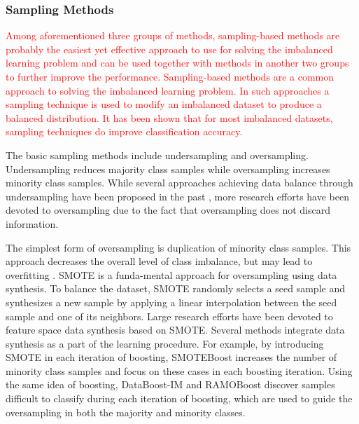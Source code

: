 \documentclass[10pt,journal,compsoc]{IEEEtran}
\begin{document}
\subsubsection{Sampling Methods}
\textcolor{red}{Among aforementioned three groups of methods, sampling-based methods are probably the easiest yet effective approach to use for solving the imbalanced learning problem and can be used together with methods in another two groups to further improve the performance. Sampling-based methods are a common approach to solving the imbalanced learning problem. In such approaches a sampling technique is used to modify an imbalanced dataset to produce a balanced distribution. It has been shown that for most imbalanced datasets, sampling techniques do improve classification accuracy.}

The basic sampling methods include undersampling and oversampling. Undersampling reduces majority class samples while oversampling increases minority class samples. While several approaches achieving data balance through undersampling have been proposed in the past \cite{liu2009exploratory}\cite{ZJMI03}, more research efforts have been devoted to oversampling due to the fact that oversampling does not discard information.

The simplest form of oversampling is duplication of minority class samples. This approach decreases the overall level of class imbalance, but may lead to overfitting \cite{Drummond03c4.5}. SMOTE \cite{CNV:02} is a funda-mental approach for oversampling using data synthesis. To balance the dataset, SMOTE randomly selects a seed sample and synthesizes a new sample by applying a linear interpolation between the seed sample and one of its neighbors. Large research efforts have been devoted to feature space data synthesis based on SMOTE.
Several methods integrate data synthesis as a part of the learning procedure. For example, by introducing SMOTE in each iteration of boosting, SMOTEBoost \cite{chawla2003smoteboost} increases the number of minority class samples and focus on these cases in each boosting iteration. Using the same idea of boosting, DataBoost-IM \cite{guo2004learning} and RAMOBoost \cite{chen2010ramoboost} discover samples difficult to classify during each iteration of boosting, which are used to guide the oversampling in both the majority and minority classes.
\end{document}
